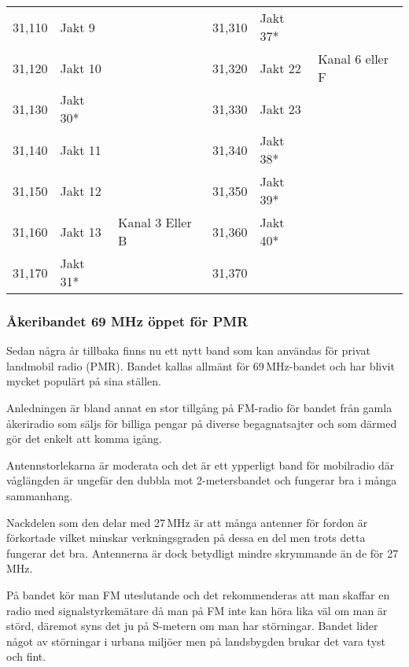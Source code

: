 \begin{longtable}{rll|rll}
	           31,110 & Jakt 9             &                   &   31,310          &   Jakt 37*         &                   \\
	           31,120 & Jakt 10            &                   &   31,320          &   Jakt 22          & Kanal 6 eller F   \\
	           31,130 & Jakt 30*           &                   &   31,330          &   Jakt 23          &                   \\
	           31,140 & Jakt 11            &                   &   31,340          &   Jakt 38*         &                   \\
	           31,150 & Jakt 12            &                   &   31,350          &   Jakt 39*        &                   \\
	           31,160 & Jakt 13            & Kanal 3 Eller B   &   31,360          &   Jakt 40*         &                   \\
	           31,170 & Jakt 31*           &                   &   31,370          &                    &
\end{longtable}

\subsubsection{Åkeribandet 69 MHz öppet för PMR}

Sedan några år tillbaka finns nu ett nytt band som kan användas för privat
landmobil radio (PMR). Bandet kallas allmänt för 69\,MHz-bandet och har blivit
mycket populärt på sina ställen.

Anledningen är bland annat en stor tillgång på FM-radio för bandet från gamla
åkeriradio som säljs för billiga pengar på diverse begagnatsajter och som
därmed gör det enkelt att komma igång.

Antennstorlekarna är moderata och det är ett ypperligt band för mobilradio där
våglängden är ungefär den dubbla mot 2-metersbandet och fungerar bra i många
sammanhang.

Nackdelen som den delar med 27\,MHz är att många antenner för fordon är
förkortade vilket minskar verkningsgraden på dessa en del men trots detta
fungerar det bra. Antennerna är dock betydligt mindre skrymmande än de för
27\,MHz.

På bandet kör man FM uteslutande och det rekommenderas att man skaffar en
radio med signalstyrkemätare då man på FM inte kan höra lika väl om man är
störd, däremot syns det ju på S-metern om man har störningar. Bandet lider
något av störningar i urbana miljöer men på landsbygden brukar det vara tyst
och fint.

